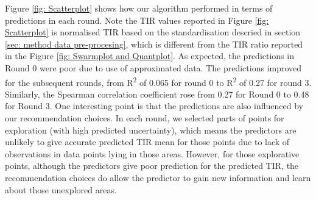 \documentclass{article}
\begin{document}
Figure \ref{fig: Scatterplot} shows how our algorithm performed in terms of predictions in each round. 
Note the TIR values reported in Figure \ref{fig: Scatterplot} is normalised TIR based on the standardisation descried in section \ref{sec: method data pre-procesing}, which is different from the TIR ratio reported in the Figure \ref{fig: Swarmplot and Quantplot}.
As expected, the predictions in Round 0 were poor due to use of approximated data. 
The predictions improved for the subsequent rounds, from R\textsuperscript{2} of 0.065 for round 0 to R\textsuperscript{2} of 0.27 for round 3.
Similarly, the Spearman correlation coefficient rose from 0.27 for Round 0 to 0.48 for Round 3.
One interesting point is that the predictions are also influenced by our recommendation choices. 
In each round, we selected parts of points for exploration (with high predicted uncertainty), which means the predictors are unlikely to give accurate predicted TIR mean for those points due to lack of observations in data points lying in those areas. 
However, for those explorative points, although the predictors give poor prediction for the predicted TIR, the recommendation choices do allow the predictor to gain new information and learn about those unexplored areas. 
\end{document}
